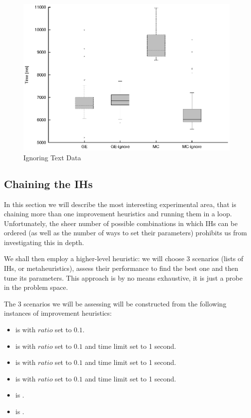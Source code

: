 \begin{figure}
  \caption{Ignoring Text Data}
  \label{image-experiment-ignore-text-data}
  \centering
    \includegraphics[width=\textwidth]{images/experiments/ignore-text-data}
\end{figure}

\subsection{Chaining the IHs}


In this section we will describe the most interesting experimental area, that is chaining more than one improvement heuristics and running them in a loop. Unfortunately, the sheer number of possible combinations in which IHs can be ordered (as well as the number of ways to set their parameters) prohibits us from investigating this in depth.

We shall then employ a higher-level heuristic: we will choose 3 scenarios (lists of IHs, or metaheuristics), assess their performance to find the best one and then tune its parameters. This approach is by no means exhaustive, it is just a probe in the problem space.

The 3 scenarios we will be assessing will be constructed from the following instances of improvement heuristics:

\begin{itemize}
	\item {} is  with $ratio$ set to $0.1$.
	\item {} is  with $ratio$ set to $0.1$ and time limit set to 1 second.
	\item {} is  with $ratio$ set to $0.1$ and time limit set to 1 second.
	\item {} is  with $ratio$ set to $0.1$ and time limit set to 1 second.
	\item {} is .
	\item {} is .
\end{itemize}

